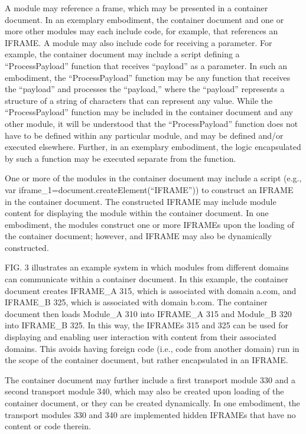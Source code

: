 A module
may reference a frame, which may be presented in a container
document. In an exemplary embodiment, the container document and one
or more other modules may each include code, for example, that
references an IFRAME. A module may also include code for receiving a
parameter. For example, the container document may include a script
defining a ``ProcessPayload'' function that receives
``payload'' as a parameter. In such an embodiment, the
``ProcessPayload'' function may be any function that
receives the ``payload'' and processes the
``payload,'' where the ``payload'' represents
a structure of a string of characters that can represent any
value. While the ``ProcessPayload'' function may be
included in the container document and any other module, it will be
understood that the ``ProcessPayload'' function does not
have to be defined within any particular module, and may be defined
and/or executed elsewhere. Further, in an exemplary embodiment, the
logic encapsulated by such a function may be executed separate from
the function.



One or more of the modules in
the container document may include a script (e.g., var
iframe\_1=document.createElement(``IFRAME'')) to
construct an IFRAME in the container document. The constructed IFRAME
may include module content for displaying the module within the
container document. In one embodiment, the modules construct one or
more IFRAMEs upon the loading of the container document; however, and
IFRAME may also be dynamically constructed.



FIG. 3 illustrates an example system in which modules from
different domains can communicate within a container document. In this
example, the container document creates IFRAME\_A 315, which is
associated with domain a.com, and IFRAME\_B 325, which is
associated with domain b.com. The container document then loads
Module\_A 310 into IFRAME\_A 315 and Module\_B 320
into IFRAME\_B 325. In this way, the IFRAMEs 315 and
325 can be used for displaying and enabling user interaction
with content from their associated domains. This avoids having foreign
code (i.e., code from another domain) run in the scope of the
container document, but rather encapsulated in an IFRAME.



The container document may further include a
first transport module 330 and a second transport module
340, which may also be created upon loading of the container
document, or they can be created dynamically. In one embodiment, the
transport modules 330 and 340 are implemented hidden
IFRAMEs that have no content or code therein.



